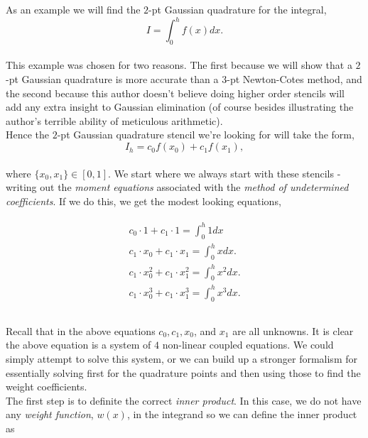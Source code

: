 \documentclass[paper=a4, fontsize=11pt]{scrartcl} %
\numberwithin{equation}{section} %
\numberwithin{figure}{section} %
\numberwithin{table}{section} %
\begin{document}
As an example we will find the $2$-pt Gaussian quadrature for the integral,\\

 $$I = \int_0^h f(x) dx.$$\\

This example was chosen for two reasons. The first because we will show that a $2$-pt Gaussian quadrature is more accurate than a $3$-pt Newton-Cotes method, and the second because this author doesn't believe doing higher order stencils will add any extra insight to Gaussian elimination (of course besides illustrating the author's terrible ability of meticulous arithmetic).\\

Hence the $2$-pt Gaussian quadrature stencil we're looking for will take the form, \\ $$I_h = c_0 f(x_0) + c_1 f(x_1),$$\\

where $\{x_0,x_1\}\in[0,1].$ We start where we always start with these stencils - writing out the \emph{moment equations} associated with the \emph{method of undetermined coefficients}. If we do this, we get the modest looking equations, 

\begin{align}
\nonumber
\begin{split}
c_0\cdot 1         + c_1\cdot 1            = \int_0^h 1 dx  \\
c_1\cdot x_0     + c_1\cdot x_1       = \int_0^h x dx. \\
c_1\cdot x_0^2 + c_1\cdot x_1^2  = \int_0^h x^2 dx. \\ 
c_1\cdot x_0^3 + c_1\cdot x_1^3  = \int_0^h x^3 dx. \\ \\
\end{split}
\end{align}

Recall that in the above equations $c_0, c_1, x_0$, and $x_1$ are all unknowns. It is clear the above equation is a system of $4$ non-linear coupled equations. We could simply attempt to solve this system, or we can build up a stronger formalism for essentially solving first for the quadrature points and then using those to find the weight coefficients. \\

The first step is to definite the correct \emph{inner product}. In this case, we do not have any \emph{weight function}, $w(x)$, in the integrand so we can define the inner product as\\ 
\end{document}
